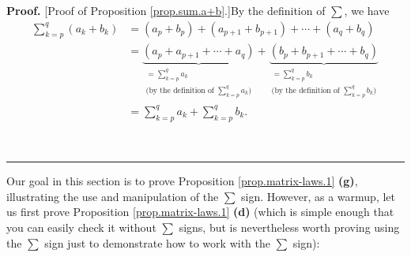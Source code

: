 \documentclass[numbers=enddot,12pt,final,onecolumn,notitlepage]{scrartcl}%
\theoremstyle{definition}
\newenvironment{proof}[1][Proof]{\noindent\textbf{#1.} }{\ \rule{0.5em}{0.5em}}
\let\sumnonlimits\sum
\renewcommand{\sum}{\sumnonlimits\limits}
\begin{document}
\begin{proof}
[Proof of Proposition \ref{prop.sum.a+b}.]By the definition of $\sum$, we have%
\begin{align*}
\sum_{k=p}^{q}\left(  a_{k}+b_{k}\right)   &  =\left(  a_{p}+b_{p}\right)
+\left(  a_{p+1}+b_{p+1}\right)  +\cdots+\left(  a_{q}+b_{q}\right) \\
&  =\underbrace{\left(  a_{p}+a_{p+1}+\cdots+a_{q}\right)  }_{\substack{=\sum
_{k=p}^{q}a_{k}\\\text{(by the definition of }\sum_{k=p}^{q}a_{k}\text{)}%
}}+\underbrace{\left(  b_{p}+b_{p+1}+\cdots+b_{q}\right)  }_{\substack{=\sum
_{k=p}^{q}b_{k}\\\text{(by the definition of }\sum_{k=p}^{q}b_{k}\text{)}}}\\
&  =\sum_{k=p}^{q}a_{k}+\sum_{k=p}^{q}b_{k}.
\end{align*}

\end{proof}

Our goal in this section is to prove Proposition \ref{prop.matrix-laws.1}
\textbf{(g)}, illustrating the use and manipulation of the $\sum$ sign.
However, as a warmup, let us first prove Proposition \ref{prop.matrix-laws.1}
\textbf{(d)} (which is simple enough that you can easily check it without
$\sum$ signs, but is nevertheless worth proving using the $\sum$ sign just to
demonstrate how to work with the $\sum$ sign):
\end{document}
